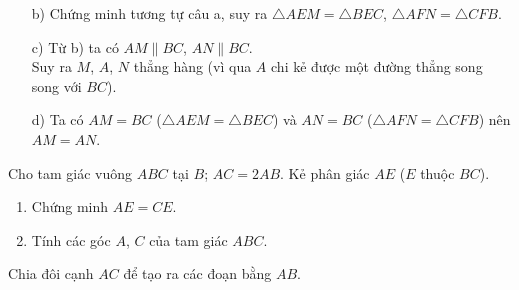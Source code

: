 \begin{vd}
{{\begin{tikzpicture}[scale=.8,font=\footnotesize, line join=round, line cap=round, >=stealth]
			\end{tikzpicture}
		}
		\begin{enumerate}
			\item [b)]  Chứng minh tương tự câu a, suy ra $\triangle AEM = \triangle BEC$, $\triangle AFN =
			\triangle CFB$.
			\item [c)]Từ b) ta có $AM \parallel BC$, $AN \parallel BC$.\\
			Suy ra $M$, $A$, $N$ thẳng hàng (vì qua $A$ chi kẻ được một đường thẳng song song với $BC$).
			\item [d)] Ta có $AM = BC$ ($\triangle AEM = \triangle BEC$) và $AN = BC$ ($\triangle AFN =
			\triangle CFB$) nên $AM = AN$.
		\end{enumerate}
		
		
	}
\end{vd}
\begin{vd} %
	Cho tam giác vuông $ABC$ tại $B$; $AC = 2AB$. Kẻ phân giác $AE$ ($E$ thuộc $BC$).
	\begin{enumerate}
		\item Chứng minh $AE = CE$.
		\item Tính các góc $A$, $C$ của tam giác $ABC$.
	\end{enumerate}
	
	\begin{note}
		Chia đôi cạnh $AC$ để tạo ra các đoạn bằng $AB$.
	\end{note}
	

\end{vd}
